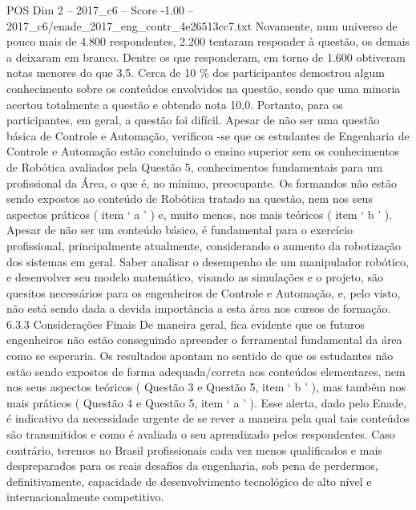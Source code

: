 \begin{textsample}{POS Dim 2 – 2017\_c6 – Score -1.00 – 2017\_c6/enade\_2017\_eng\_contr\_4e26513cc7.txt}
Novamente, num universo de pouco mais de 4.800 respondentes, 2.200 tentaram responder à questão, os demais a deixaram em branco.
Dentre os que responderam, em torno de 1.600 obtiveram notas menores do que 3,5.
Cerca de 10 \% dos participantes demostrou algum conhecimento sobre os conteúdos envolvidos na questão, sendo que uma minoria acertou totalmente a questão e obtendo nota 10,0.
Portanto, para os participantes, em geral, a questão foi difícil.
Apesar de não ser uma questão básica de Controle e Automação, verificou -se que os estudantes de Engenharia de Controle e Automação estão concluindo o ensino superior sem os conhecimentos de Robótica avaliados pela Questão 5, conhecimentos fundamentais para um profissional da Área, o que é, no mínimo, preocupante.
Os formandos não estão sendo expostos ao conteúdo de Robótica tratado na questão, nem nos seus aspectos práticos ( item ‘ a ’ ) e, muito menos, nos mais teóricos ( item ‘ b ’ ).
Apesar de não ser um conteúdo básico, é fundamental para o exercício profissional, principalmente atualmente, considerando o aumento da robotização dos sistemas em geral.
Saber analisar o desempenho de um manipulador robótico, e desenvolver seu modelo matemático, visando as simulações e o projeto, são quesitos necessários para os engenheiros de Controle e Automação, e, pelo visto, não está sendo dada a devida importância a esta área nos cursos de formação. 6.3.3 Considerações Finais De maneira geral, fica evidente que os futuros engenheiros não estão conseguindo apreender o ferramental fundamental da área como se esperaria.
Os resultados apontam no sentido de que os estudantes não estão sendo expostos de forma adequada/correta aos conteúdos elementares, nem nos seus aspectos teóricos ( Questão 3 e Questão 5, item ‘ b ’ ), mas também nos mais práticos ( Questão 4 e Questão 5, item ‘ a ’ ).
Esse alerta, dado pelo Enade, é indicativo da necessidade urgente de se rever a maneira pela qual tais conteúdos são transmitidos e como é avaliada o seu aprendizado pelos respondentes.
Caso contrário, teremos no Brasil profissionais cada vez menos qualificados e mais despreparados para os reais desafios da engenharia, sob pena de perdermos, definitivamente, capacidade de desenvolvimento tecnológico de alto nível e internacionalmente competitivo.

\end{textsample}
